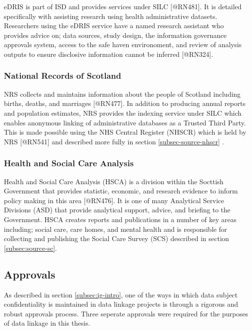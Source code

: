 \documentclass[]{article}
\begin{document}
eDRIS is part of ISD and provides services under SILC {[}@RN481{]}. It
is detailed specifically with assisting research using health
administrative datasets. Researchers using the eDRIS service have a
named research assistant who provides advice on; data sources, study
design, the information governance approvals system, access to the safe
haven environoment, and review of analysis outputs to ensure disclosive
information cannot be inferred {[}@RN324{]}.

\subsubsection{National Records of Scotland}\label{subsec:nrs}

NRS collects and maintains information about the people of Scotland
including births, deaths, and marriages {[}@RN477{]}. In addition to
producing annual reports and population estimates, NRS provides the
indexing service under SILC which enables anonymous linking of
administrative databases as a Trusted Third Party. This is made possible
using the NHS Central Register (NHSCR) which is held by NRS {[}@RN541{]}
and described more fully in section \ref{subsec-source-nhscr} .

\subsubsection{Health and Social Care Analysis}\label{subsec:asd}

Health and Social Care Analysis (HSCA) is a division within the Socttish
Government that provides statistic, economic, and research evidence to
inform policy making in this area {[}@RN476{]}. It is one of many
Analytical Service Divisions (ASD) that provide analytical support,
advice, and briefing to the Government. HSCA creates reports and
publications in a number of key areas including; social care, care
homes, and mental health and is responsible for collecting and
publishing the Social Care Survey (SCS) described in section
\ref{subsec:source-sc}.

\subsection{Approvals}\label{subsec:data-approvals}

As described in section \ref{subsec:ig-intro}, one of the ways in which
data subject confidentiality is maintained in data linkage projects is
through a rigorous and robust approvals process. Three seperate
approvals were required for the purposes of data linkage in this thesis.
\end{document}
